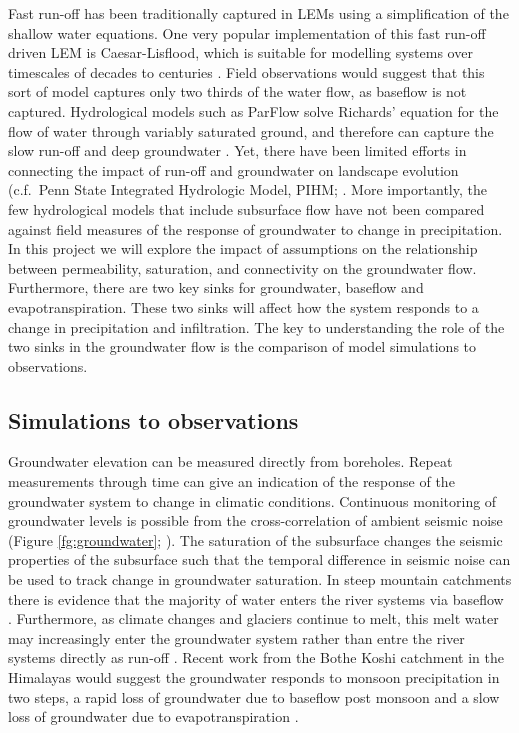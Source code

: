 Fast run-off has been traditionally captured in LEMs using a simplification of the shallow water equations. One very popular implementation of this fast run-off driven LEM is Caesar-Lisflood, which is suitable for modelling systems over timescales of decades to centuries \citep{coulthard-etal-2013}. Field observations would suggest that this sort of model captures only two thirds of the water flow, as baseflow is not captured. Hydrological models such as ParFlow solve Richards' equation for the flow of water through variably saturated ground, and therefore can capture the slow run-off and deep groundwater \citep[e.g.][]{jones-2001,maxwell-etal-2015}. Yet, there have been limited efforts in connecting the impact of run-off and groundwater on landscape evolution (c.f.\ Penn State Integrated Hydrologic Model, PIHM; \citep{zhang-etal-2016}. More importantly, the few hydrological models that include subsurface flow have not been compared against field measures of the response of groundwater to change in precipitation.
In this project we will explore the impact of assumptions on the relationship between permeability, saturation, and connectivity on the groundwater flow. Furthermore, there are two key sinks for groundwater, baseflow and evapotranspiration. These two sinks will affect how the system responds to a change in precipitation and infiltration. The key to understanding the role of the two sinks in the groundwater flow is the comparison of model simulations to observations.

\subsection{Simulations to observations}

Groundwater elevation can be measured directly from boreholes. Repeat measurements through time can give an indication of the response of the groundwater system to change in climatic conditions. Continuous monitoring of groundwater levels is possible from the cross-correlation of ambient seismic noise (Figure \ref{fg:groundwater}; \citealp{lecocq-etal-2017,clements-2018}). The saturation of the subsurface changes the seismic properties of the subsurface such that the temporal difference in seismic noise can be used to track change in groundwater saturation. In steep mountain catchments there is evidence that the majority of water enters the river systems via baseflow \citep{jasechko-etal-2016}. Furthermore, as climate changes and glaciers continue to melt, this melt water may increasingly enter the groundwater system rather than entre the river systems directly as run-off \citep{vincent-etal-2019}. Recent work from the Bothe Koshi catchment in the Himalayas would suggest the groundwater responds to monsoon precipitation in two steps, a rapid loss of groundwater due to baseflow post monsoon and a slow loss of groundwater due to evapotranspiration \citep{illien-etal-2020}.

